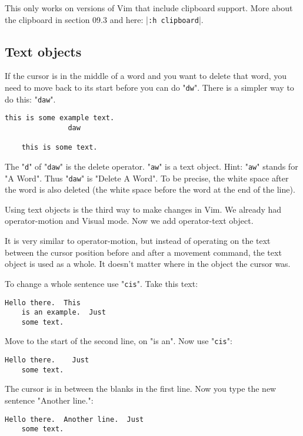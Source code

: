 This only works on versions of Vim that include clipboard support.
More about the clipboard in section 09.3 and here: |\texttt{:h clipboard}|.

\subsection{Text objects}

If the cursor is in the middle of a word and you want to delete that word, you need to move back to its start before you can do "\texttt{dw}".
There is a simpler way to do this: "\texttt{daw}".

\begin{Verbatim}[samepage=true]
    this is some example text. 
               daw

    this is some text. 
\end{Verbatim}

The "\texttt{d}" of "\texttt{daw}" is the delete operator.
"\texttt{aw}" is a text object.
Hint: "\texttt{aw}" stands for "A Word".
Thus "\texttt{daw}" is "Delete A Word".
To be precise, the white space after the word is also deleted (the white space before the word at the end of the line).

Using text objects is the third way to make changes in Vim.
We already had operator-motion and Visual mode.
Now we add operator-text object.

It is very similar to operator-motion, but instead of operating on the text between the cursor position before and after a movement command, the text object is used as a whole.
It doesn't matter where in the object the cursor was.

To change a whole sentence use "\texttt{cis}".
Take this text:

\begin{Verbatim}[samepage=true]
    Hello there.  This 
    is an example.  Just 
    some text. 
\end{Verbatim}

Move to the start of the second line, on "is an".
Now use "\texttt{cis}":

\begin{Verbatim}[samepage=true]
    Hello there.    Just 
    some text. 
\end{Verbatim}

The cursor is in between the blanks in the first line.
Now you type the new sentence "Another line.":

\begin{Verbatim}[samepage=true]
    Hello there.  Another line.  Just 
    some text. 
\end{Verbatim}

